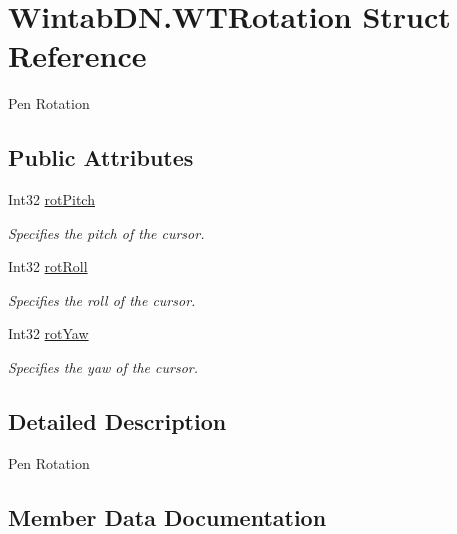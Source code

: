 \hypertarget{struct_wintab_d_n_1_1_w_t_rotation}{}\section{Wintab\+D\+N.\+W\+T\+Rotation Struct Reference}
\label{struct_wintab_d_n_1_1_w_t_rotation}


Pen Rotation  


\subsection*{Public Attributes}
\begin{DoxyCompactItemize}
\item 
Int32 \mbox{\hyperlink{struct_wintab_d_n_1_1_w_t_rotation_a60fe496108a9127f80ace7327904d44c}{rot\+Pitch}}
\begin{DoxyCompactList}\small\item\em Specifies the pitch of the cursor. \end{DoxyCompactList}\item 
Int32 \mbox{\hyperlink{struct_wintab_d_n_1_1_w_t_rotation_ab249b4f370c315f0d5c69c7c7bfaaaf7}{rot\+Roll}}
\begin{DoxyCompactList}\small\item\em Specifies the roll of the cursor. \end{DoxyCompactList}\item 
Int32 \mbox{\hyperlink{struct_wintab_d_n_1_1_w_t_rotation_a506b0504ac47ba39a4aebadc7a6e16de}{rot\+Yaw}}
\begin{DoxyCompactList}\small\item\em Specifies the yaw of the cursor. \end{DoxyCompactList}\end{DoxyCompactItemize}


\subsection{Detailed Description}
Pen Rotation 



\subsection{Member Data Documentation}
\mbox{\label{struct_wintab_d_n_1_1_w_t_rotation_a60fe496108a9127f80ace7327904d44c}} 
